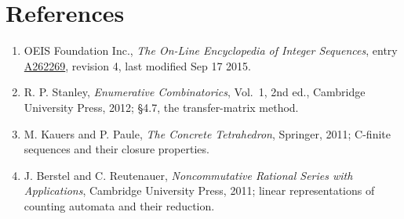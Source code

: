 \documentclass[11pt]{article}
\theoremstyle{definition}
\begin{document}
\section{References}

\begin{enumerate}

\item OEIS Foundation Inc., \emph{The On-Line Encyclopedia of Integer Sequences}, entry \href{https://oeis.org/A262269}{A262269}, revision 4, last modified Sep 17 2015.

\item R. P. Stanley, \emph{Enumerative Combinatorics}, Vol.~1, 2nd ed., Cambridge University Press, 2012; \S4.7, the transfer-matrix method.

\item M. Kauers and P. Paule, \emph{The Concrete Tetrahedron}, Springer, 2011; C-finite sequences and their closure properties.

\item J. Berstel and C. Reutenauer, \emph{Noncommutative Rational Series with Applications}, Cambridge University Press, 2011; linear representations of counting automata and their reduction.

\end{enumerate}
\end{document}
